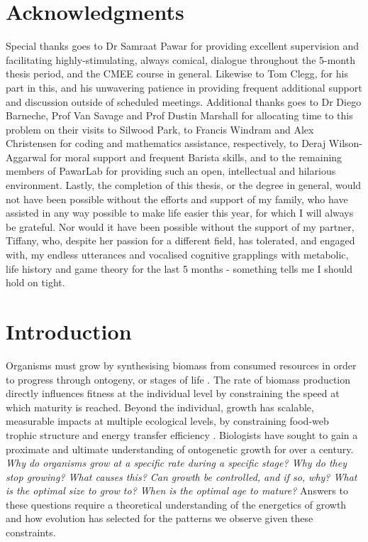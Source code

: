 \documentclass[a4paper]{article} %
\begin{document}
\section*{Acknowledgments}\thispagestyle{plain}
    Special thanks goes to Dr Samraat Pawar for providing excellent supervision and facilitating  highly-stimulating, always comical, dialogue throughout the 5-month thesis period, and the CMEE course in general. Likewise to Tom Clegg, for his part in this, and his unwavering patience in providing frequent additional support and discussion outside of scheduled meetings. Additional thanks goes to Dr Diego Barneche, Prof Van Savage and Prof Dustin Marshall for allocating time to this problem on their visits to Silwood Park, to Francis Windram and Alex Christensen for coding and mathematics assistance, respectively, to Deraj Wilson-Aggarwal for moral support and frequent Barista skills, and to the remaining members of PawarLab for providing such an open, intellectual and hilarious environment. Lastly, the completion of this thesis, or the degree in general, would not have been possible without the efforts and support of my family, who have assisted in any way possible to make life easier this year, for which I will always be grateful. Nor would it have been possible without the support of my partner, Tiffany, who, despite her passion for a different field, has tolerated, and engaged with, my endless utterances and vocalised cognitive grapplings with metabolic, life history and game theory for the last 5 months - something tells me I should hold on tight.

\newpage\tableofcontents\thispagestyle{plain}

\newpage\listoffigures\thispagestyle{plain}


\newpage

\section{Introduction}\thispagestyle{plain}
    Organisms must grow by synthesising biomass from consumed resources in order to progress through ontogeny, or stages of life \autocite{Hariharan2016}. The rate of biomass production directly influences fitness at the individual level by constraining the speed at which maturity is reached. Beyond the individual, growth has scalable, measurable impacts at multiple ecological levels, by constraining food-web trophic structure and energy transfer efficiency \autocite{Barneche2018}. Biologists have sought to gain a proximate and ultimate understanding of ontogenetic growth for over a century. \textit{Why do organisms grow at a specific rate during a specific stage? Why do they stop growing? What causes this? Can growth be controlled, and if so, why? What is the optimal size to grow to? When is the optimal age to mature?} Answers to these questions require a theoretical understanding of the energetics of growth and how evolution has selected for the patterns we observe given these constraints. 
    
\end{document}
